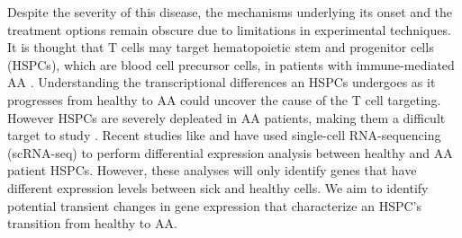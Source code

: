 \documentclass{article}
\begin{document}
Despite the severity of this disease, the mechanisms underlying its onset and the treatment options remain obscure due to limitations in experimental techniques.
It is thought that T cells may target hematopoietic stem and progenitor cells (HSPCs), which are blood cell precursor cells, in patients with immune-mediated AA \citep{tonglin_single-cell_2022}.
Understanding the transcriptional differences an HSPCs undergoes as it progresses from healthy to AA could uncover the cause of the T cell targeting.
However HSPCs are severely depleated in AA patients, making them a difficult target to study \citep{zhu_single-cell_2021}.
Recent studies like \citet{tonglin_single-cell_2022} and \citet{zhu_single-cell_2021} have used single-cell RNA-sequencing (scRNA-seq) to perform differential expression analysis between healthy and AA patient HSPCs.
However, these analyses will only identify genes that have different expression levels between sick and healthy cells.
We aim to identify potential transient changes in gene expression that characterize an HSPC's transition from healthy to AA.

\end{document}
